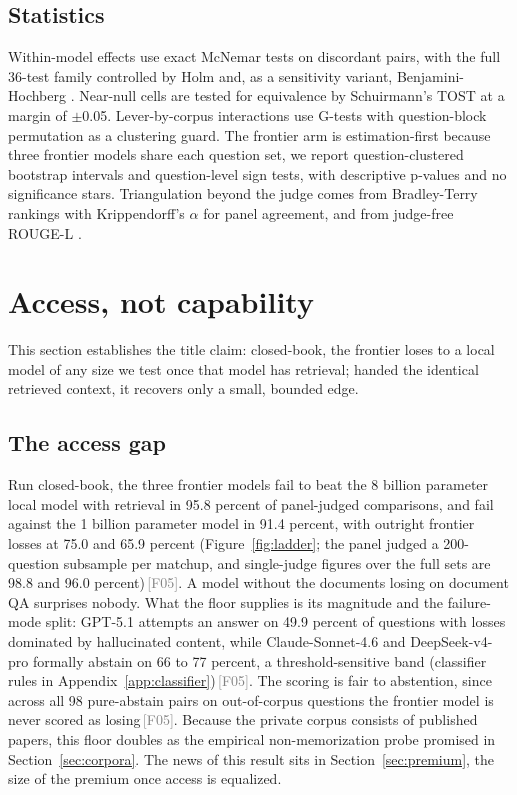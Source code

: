 \documentclass[11pt]{article}
\newcommand{\rcpt}[1]{\textcolor{gray}{\,\textsf{\scriptsize[#1]}}}
\begin{document}
\subsection{Statistics}
Within-model effects use exact McNemar tests \citep{mcnemar1947note} on discordant pairs, with the full 36-test family controlled by Holm \citep{holm1979simple} and, as a sensitivity variant, Benjamini-Hochberg \citep{benjamini1995controlling}. Near-null cells are tested for equivalence by Schuirmann's TOST \citep{schuirmann1987tost} at a margin of $\pm$0.05. Lever-by-corpus interactions use G-tests with question-block permutation as a clustering guard. The frontier arm is estimation-first because three frontier models share each question set, we report question-clustered bootstrap intervals and question-level sign tests, with descriptive p-values and no significance stars. Triangulation beyond the judge comes from Bradley-Terry rankings \citep{bradley1952rank} with Krippendorff's $\alpha$ \citep{krippendorff2004content} for panel agreement, and from judge-free ROUGE-L \citep{lin2004rouge}.

\section{Access, not capability}
\label{sec:access}

This section establishes the title claim: closed-book, the frontier loses to a local model of any size we test once that model has retrieval; handed the identical retrieved context, it recovers only a small, bounded edge.

\subsection{The access gap}
\label{sec:accessgap}

Run closed-book, the three frontier models fail to beat the 8 billion parameter local model with retrieval in 95.8 percent of panel-judged comparisons, and fail against the 1 billion parameter model in 91.4 percent, with outright frontier losses at 75.0 and 65.9 percent (Figure~\ref{fig:ladder}; the panel judged a 200-question subsample per matchup, and single-judge figures over the full sets are 98.8 and 96.0 percent)\rcpt{F05}. A model without the documents losing on document QA surprises nobody. What the floor supplies is its magnitude and the failure-mode split: GPT-5.1 attempts an answer on 49.9 percent of questions with losses dominated by hallucinated content, while Claude-Sonnet-4.6 and DeepSeek-v4-pro formally abstain on 66 to 77 percent, a threshold-sensitive band (classifier rules in Appendix~\ref{app:classifier})\rcpt{F05}. The scoring is fair to abstention, since across all 98 pure-abstain pairs on out-of-corpus questions the frontier model is never scored as losing\rcpt{F05}. Because the private corpus consists of published papers, this floor doubles as the empirical non-memorization probe promised in Section~\ref{sec:corpora}. The news of this result sits in Section~\ref{sec:premium}, the size of the premium once access is equalized.
\end{document}
